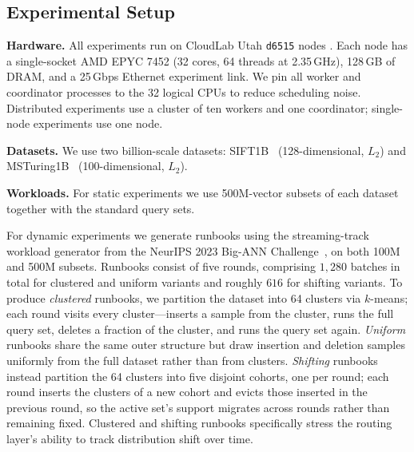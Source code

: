 \documentclass[sigconf,review,anonymous]{acmart}
\begin{document}
\subsection{Experimental Setup}
\label{sec:eval-setup}
\textbf{Hardware.} All experiments run on CloudLab Utah \texttt{d6515} nodes \cite{Duplyakin+:ATC19}. Each node has a single-socket AMD EPYC 7452 (32 cores, 64 threads at 2.35\,GHz), 128\,GB of DRAM, and a 25\,Gbps Ethernet experiment link. We pin all worker and coordinator processes to the 32 logical CPUs to reduce scheduling noise. Distributed experiments use a cluster of ten workers and one coordinator; single-node experiments use one node.

\textbf{Datasets.} We use two billion-scale datasets: SIFT1B~\cite{jegou2011searching, simhadri2022results} (128-dimensional, $L_2$) and MSTuring1B~\cite{simhadri2022results} (100-dimensional, $L_2$).

\textbf{Workloads.} For static experiments we use 500M-vector subsets of each dataset together with the standard query sets. 

For dynamic experiments we generate runbooks using the streaming-track workload generator from the NeurIPS 2023 Big-ANN Challenge~\cite{simhadri2024results}, on both 100M and 500M subsets. Runbooks consist of five rounds, comprising $1{,}280$ batches in total for clustered and uniform variants and roughly $616$ for shifting variants. To produce \emph{clustered} runbooks, we partition the dataset into 64 clusters via $k$-means; each round visits every cluster---inserts
a sample from the cluster, runs the full query set, deletes a fraction of the cluster, and runs the query set again. \emph{Uniform} runbooks share the same outer structure but draw insertion and deletion samples uniformly from the full dataset rather than from clusters. \emph{Shifting} runbooks instead partition the 64 clusters into five disjoint cohorts, one per round; each round inserts the clusters of a new cohort and evicts those inserted in the previous round, so the active set's support migrates across rounds rather than remaining fixed. Clustered and shifting runbooks specifically stress the routing layer's ability to track distribution shift over time.

\end{document}
